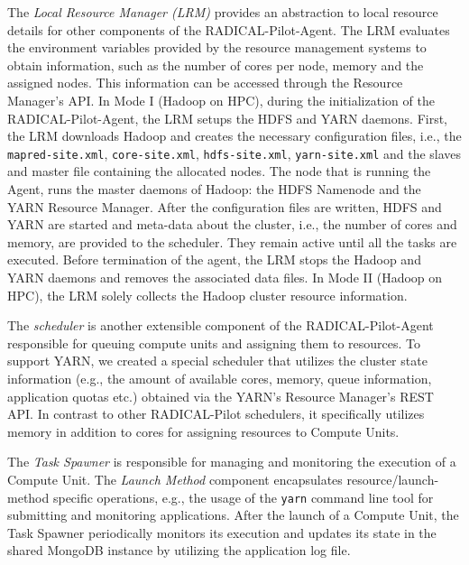 The \emph{Local Resource Manager (LRM)} provides an abstraction to local
resource details for other components of the RADICAL-Pilot-Agent. The LRM
evaluates the environment variables provided by the resource management systems
to obtain information, such as the number of cores per node, memory and the
assigned nodes. This information can be accessed through the Resource Manager's
API. In Mode I (Hadoop on HPC), during the initialization of the
RADICAL-Pilot-Agent, the LRM setups the HDFS and YARN daemons. First, the LRM
downloads Hadoop and creates the necessary configuration files, i.e., the
\texttt{mapred-site.xml}, \texttt{core-site.xml}, \texttt{hdfs-site.xml},
\texttt{yarn-site.xml} and the slaves and master file containing the allocated
nodes. The node that is running the Agent, runs the master daemons of Hadoop:
the HDFS Namenode and the YARN Resource Manager. After the configuration files
are written, HDFS and YARN are started and meta-data about the cluster, i.e.,
the number of cores and memory, are provided to the scheduler. They remain
active until all the tasks are executed. Before termination of the agent, the
LRM stops the Hadoop and YARN daemons and removes the associated data files. In
Mode II (Hadoop on HPC), the LRM solely collects the Hadoop cluster resource
information.

The \emph{scheduler} is another extensible component of the RADICAL-Pilot-Agent responsible for queuing compute units and assigning them to resources.
To support YARN, we created a special scheduler that utilizes the cluster state information (e.g., the amount of available cores, memory, queue information, application quotas etc.) obtained via the YARN's Resource Manager's REST API.
In contrast to other RADICAL-Pilot schedulers, it specifically utilizes memory in addition to cores for assigning resources to Compute Units.

The \emph{Task Spawner} is responsible for managing and monitoring the execution of a Compute Unit.
The \emph{Launch Method} component encapsulates resource/launch-method specific operations, e.g., the usage of the \texttt{yarn} command line tool for submitting and monitoring applications.
After the launch of a Compute Unit, the Task Spawner periodically monitors its execution and updates its state in the shared MongoDB instance by utilizing the application log file.

